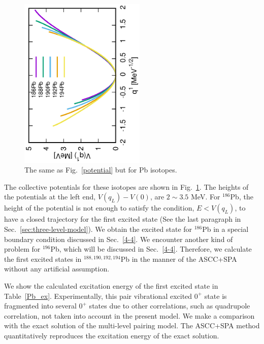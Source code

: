 \documentclass[11pt]{book} %
\begin{document}
\begin{figure}[bt]
 \begin{center}
  \includegraphics[width=60mm,angle=-90]{images/Pbpotential.eps}
 \end{center}
	\caption{The same as Fig.~\ref{potential} but for Pb isotopes.
}
 \label{Pb_potential}
\end{figure}
The collective potentials for these isotopes are shown
in Fig.~\ref{Pb_potential}.
The heights of the potentials at the left end, $V(q_L)-V(0)$,
are $2\sim3.5$ MeV.
For $^{186}$Pb, the height of the potential is not
enough to satisfy the condition, $E<V(q_L)$,
to have a closed trajectory for the first excited state
(See the last paragraph in Sec.~\ref{sec:three-level-model}).
We obtain the excited state for $^{186}$Pb in a special boundary condition 
discussed in Sec.~\ref{4-4}. We encounter another kind of problem for $^{196}$Pb,
which will be discussed in Sec.~\ref{4-4}.
Therefore, we calculate the first excited states
in $^{188,190,192,194}$Pb in the manner of the ASCC+SPA without any artificial assumption.

We show the calculated excitation energy of the first excited state
in Table~\ref{Pb_ex}.
Experimentally, this pair vibrational excited $0^+$ state is
fragmented into several $0^+$ states due to other correlations,
such as quadrupole correlation, not taken into account in the present model.
We make a comparison with the exact solution of the multi-level
pairing model.
The ASCC+SPA method quantitatively reproduces the excitation energy of
the exact solution.
\end{document}
